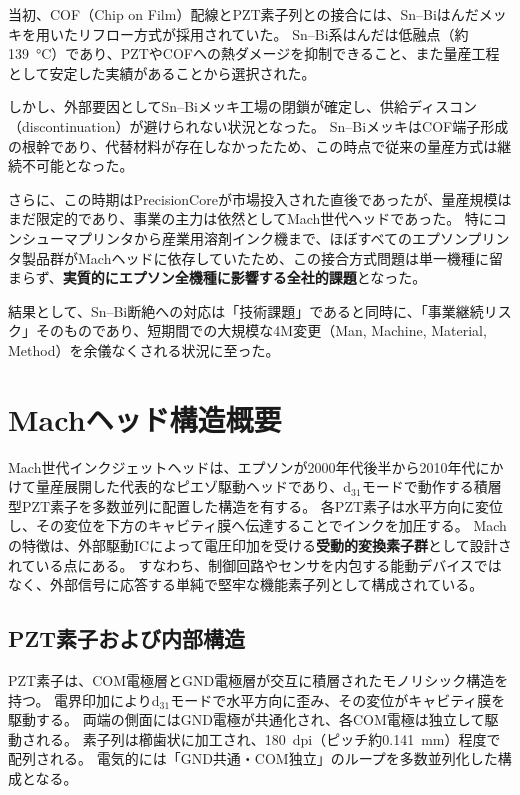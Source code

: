 \documentclass[conference]{IEEEtran}
\begin{document}
当初、COF（Chip on Film）配線とPZT素子列との接合には、Sn–Biはんだメッキを用いたリフロー方式が採用されていた。  
Sn–Bi系はんだは低融点（約\SI{139}{\degreeCelsius}）であり、PZTやCOFへの熱ダメージを抑制できること、また量産工程として安定した実績があることから選択された。  

しかし、外部要因としてSn–Biメッキ工場の閉鎖が確定し、供給ディスコン（discontinuation）が避けられない状況となった。  
Sn–BiメッキはCOF端子形成の根幹であり、代替材料が存在しなかったため、この時点で従来の量産方式は継続不可能となった。  

さらに、この時期はPrecisionCoreが市場投入された直後であったが、量産規模はまだ限定的であり、事業の主力は依然としてMach世代ヘッドであった。  
特にコンシューマプリンタから産業用溶剤インク機まで、ほぼすべてのエプソンプリンタ製品群がMachヘッドに依存していたため、この接合方式問題は単一機種に留まらず、\textbf{実質的にエプソン全機種に影響する全社的課題}となった。  

結果として、Sn–Bi断絶への対応は「技術課題」であると同時に、「事業継続リスク」そのものであり、短期間での大規模な4M変更（Man, Machine, Material, Method）を余儀なくされる状況に至った。

\section{Machヘッド構造概要}

Mach世代インクジェットヘッドは、エプソンが2000年代後半から2010年代にかけて量産展開した代表的なピエゾ駆動ヘッドであり、d$_{31}$モードで動作する積層型PZT素子を多数並列に配置した構造を有する。  
各PZT素子は水平方向に変位し、その変位を下方のキャビティ膜へ伝達することでインクを加圧する。  
Machの特徴は、外部駆動ICによって電圧印加を受ける\textbf{受動的変換素子群}として設計されている点にある。  
すなわち、制御回路やセンサを内包する能動デバイスではなく、外部信号に応答する単純で堅牢な機能素子列として構成されている。

\subsection{PZT素子および内部構造}
PZT素子は、COM電極層とGND電極層が交互に積層されたモノリシック構造を持つ。  
電界印加によりd$_{31}$モードで水平方向に歪み、その変位がキャビティ膜を駆動する。  
両端の側面にはGND電極が共通化され、各COM電極は独立して駆動される。  
素子列は櫛歯状に加工され、\SI{180}{dpi}（ピッチ約\SI{0.141}{mm}）程度で配列される。  
電気的には「GND共通・COM独立」のループを多数並列化した構成となる。
\end{document}
